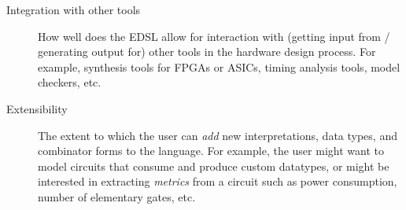 \begin{description}
            \item[Integration with other tools] How well does the EDSL allow for interaction with
            (getting input from / generating output for) other tools in the hardware design process.
            For example, synthesis tools for FPGAs or ASICs, timing analysis tools, model checkers,
            etc.

            \item[Extensibility] The extent to which the user can \emph{add} new interpretations,
            data types, and combinator forms to the language. For example, the user might want to
            model circuits that consume and produce custom datatypes, or might be interested in
            extracting \emph{metrics} from a circuit such as power consumption, number of elementary
            gates, etc.

        \end{description}
